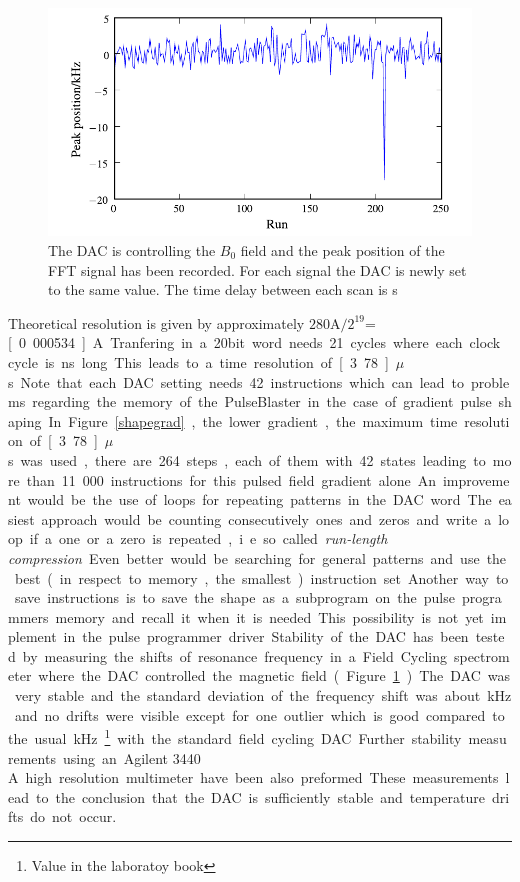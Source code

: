 \documentclass[12pt, a4paper, BCOR10mm, twoside, titlepage, headinclude]{scrbook}
\begin{document}
\begin{figure}[ht]
\centering
\includegraphics[]{pics/dac_fc}
\caption{The DAC is controlling the $B_{0}$ field and the peak position of the FFT signal has been recorded. For each signal the DAC is newly set to the same value. The time delay between each scan is \unit[50]{s} }
\label{gradstability}
\end{figure}
Theoretical resolution is given by approximately $\textrm{280A}/\textrm{2}^{\textrm{19}}$=\unit[0.000534]{A}. Tranfering in a 20bit word needs 21 cycles where each clock cycle is \unit[180]{ns} long. This leads to a time resolution of \unit[3.78]{$\mu$s}. Note that each DAC setting needs 42 instructions which can lead to problems regarding the memory of the PulseBlaster in the case of gradient pulse shaping. In Figure \ref{shapegrad},  the lower gradient, the maximum time resolution of \unit[3.78]{$\mu$s} was used, there are 264 steps, each of them with 42 states leading to more than 11.000 instructions for this pulsed field gradient alone. 

An improvement would be the use of loops for repeating patterns in the DAC word. The easiest approach would be  counting consecutively ones and zeros and write a loop if a one or a zero is repeated, i.e. so called \emph{run-length compression}. Even better would be searching for general patterns and use the best (in respect to memory, the smallest) instruction set. Another way to save instructions is to save the shape as a subprogram on the pulse programmers memory and recall it when it is needed. This possibility is not yet implement in the pulse programmer driver.

Stability of the DAC has been tested by measuring the shifts of resonance frequency in a Field Cycling spectrometer where the DAC controlled the magnetic field (Figure \ref{gradstability}). The DAC was very stable and the standard deviation of the frequency shift was about \unit[3]{kHz} and no drifts were visible except for one outlier which is good compared to the usual \unit[6]{kHz}\footnote{Value in the laboratoy book} with the standard field cycling DAC. Further stability measurements using an \textsf{Agilent 3440 A} high resolution multimeter have been also preformed. These measurements lead to the conclusion that the DAC is sufficiently stable and temperature drifts do not occur.
\end{document}
